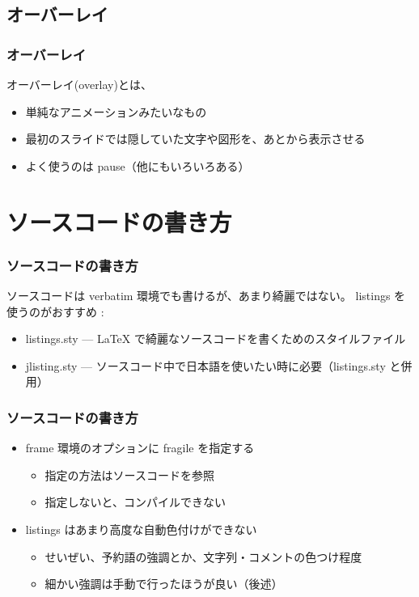 \documentclass[dvipdfmx,cjk,xcolor=dvipsnames,envcountsect,notheorems,12pt]{beamer}
\theoremstyle{definition}
\begin{document}
\subsection{オーバーレイ}

\begin{frame}
  \frametitle{オーバーレイ}
  \alert{オーバーレイ(overlay)}とは、
  \begin{itemize}
    \pause%
    \item 単純なアニメーションみたいなもの
    \pause
    \item 最初のスライドでは隠していた文字や図形を、あとから表示させる
    \pause
    \item よく使うのは pause（他にもいろいろある）
  \end{itemize}
\end{frame}

\section{ソースコードの書き方}

\begin{frame}
  \frametitle{ソースコードの書き方}
  ソースコードは verbatim 環境でも書けるが、あまり綺麗ではない。
  \vfill
  listings を使うのがおすすめ :
  \begin{itemize}
  \item listings.sty --- LaTeX で綺麗なソースコードを書くためのスタイルファイル
  \item jlisting.sty --- ソースコード中で日本語を使いたい時に必要（listings.sty と併用）
  \end{itemize}
\end{frame}

\begin{frame}
  \renewcommand{\baselinestretch}{1.3}%
  \frametitle{ソースコードの書き方}
  \begin{itemize}
  \item frame 環境のオプションに fragile を指定する
    \begin{itemize}
    \item 指定の方法はソースコードを参照
    \item 指定しないと、コンパイルできない
    \end{itemize}
  \item listings はあまり高度な自動色付けができない
    \begin{itemize}
    \item せいぜい、予約語の強調とか、文字列・コメントの色つけ程度
    \item 細かい強調は手動で行ったほうが良い（後述）
    \end{itemize}
  \end{itemize}
\end{frame}
\end{document}
